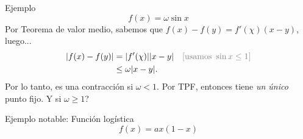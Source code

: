 \documentclass[12pt,aspectratio=169,xcolor=dvipsnames]{beamer}
\begin{document}
\begin{frame}{Ejemplo}
    $$f(x) = \omega \sin x $$
    Por Teorema de valor medio, sabemos que $f(x) - f(y)=f'(\chi)(x-y)$, luego... 
    \pause 
    \begin{equation*}
        \begin{aligned}
            |f(x) - f(y)| &= |f'(\chi)||x-y| && \textcolor{gray}{[\text{usamos } \sin x \leq 1]}\\
                        &\leq \omega |x-y|. 
        \end{aligned}
    \end{equation*}
    Por lo tanto, es una contracción si $\omega<1$. Por TPF, entonces tiene \emph{un único} punto fijo.  \pause \alert{Y si $\omega\geq1$? }

    \pause {}
\end{frame}
\begin{frame}{Ejemplo notable: Función logística}
    $$ f(x) = ax (1-x) $$
\end{frame}
\begin{frame}
    \maketitle
\end{frame}
\end{document}
